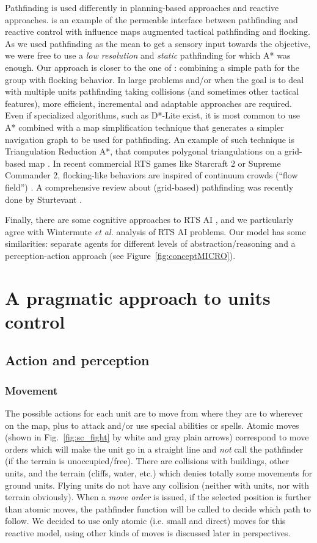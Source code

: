 Pathfinding is used differently in planning-based approaches and reactive approaches. \cite{Danielsiek_2008} is an example of the permeable interface between pathfinding and reactive control with influence maps augmented tactical pathfinding and flocking. As we used pathfinding as the mean to get a sensory input towards the objective, we were free to use a \textit{low resolution} and \textit{static} pathfinding for which A* was enough. Our approach is closer to the one of \citep{Reynolds_1999}: combining a simple path for the group with flocking behavior. In large problems and/or when the goal is to deal with multiple units pathfinding taking collisions (and sometimes other tactical features), more efficient, incremental and adaptable approaches are required. 
Even if specialized algorithms, such as D*-Lite \cite{KoenigL02} exist, it is most common to use A* combined with a map simplification technique that generates a simpler navigation graph to be used for pathfinding. An example of such technique is Triangulation Reduction A*, that computes polygonal triangulations on a grid-based map \cite{Demyen_2006}. In recent commercial RTS games like Starcraft 2 or Supreme Commander 2, flocking-like behaviors are inspired of continuum crowds (``flow field'') \cite{Treuille2006}. A comprehensive review about (grid-based) pathfinding was recently done by Sturtevant \cite{sturtevant2012benchmarks}.


Finally, there are some cognitive approaches to RTS AI \citep{SORTS}, and we particularly agree with Wintermute \textit{et al.} analysis of RTS AI problems. Our model has some similarities: separate agents for different levels of abstraction/reasoning and a perception-action approach (see Figure~\ref{fig:conceptMICRO}).

\section{A pragmatic approach to units control}
\subsection{Action and perception}
\subsubsection{Movement}
The possible actions for each unit are to move from where they are to wherever on the map, plus to attack and/or use special abilities or spells. Atomic moves (shown in Fig.~\ref{fig:sc_fight} by white and gray plain arrows) correspond to move orders which will make the unit go in a straight line and \textit{not} call the pathfinder (if the terrain is unoccupied/free). There are collisions with buildings, other units, and the terrain (cliffs, water, etc.) which denies totally some movements for ground units. Flying units do not have any collision (neither with units, nor with terrain obviously). When a \textit{move order} is issued, if the selected position is further than atomic moves, the pathfinder function will be called to decide which path to follow. We decided to use only atomic (i.e. small and direct) moves for this reactive model, using other kinds of moves is discussed later in perspectives.

